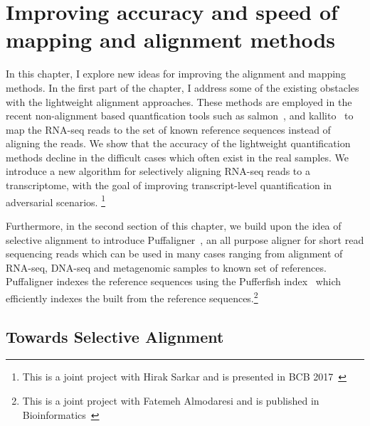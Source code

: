 
\renewcommand{\thechapter}{2}

\chapter[Alignment and mapping metods]
{Improving accuracy and speed of mapping and alignment methods}
\label{chapt2}

In this chapter, I explore new ideas for improving the alignment and mapping methods. 
In the first part of the chapter, I address some of the existing obstacles with the 
lightweight  alignment approaches. These methods are employed in the recent non-alignment 
based quantfication tools such as salmon~\citep{Patro2017Salmon}, and 
kallito~\citep{Bray2016Kallisto} to map the RNA-seq reads to the set of known reference 
sequences instead of aligning the reads. We show that the accuracy of the lightweight 
quantification methods decline in the difficult cases which often exist in the real 
samples. We introduce a new algorithm for selectively aligning RNA-seq reads to a 
transcriptome, with the goal of improving transcript-level quantification in adversarial 
scenarios.
\footnote{This is a joint project with Hirak Sarkar and is presented in BCB 2017~\citep{selaln}}

Furthermore, in the second section of this chapter, we build upon the idea of selective 
alignment to introduce Puffaligner~\citep{almodaresi2021puffaligner}, an all purpose 
aligner for short read sequencing reads which can be used in many cases ranging from 
alignment of RNA-seq, DNA-seq and metagenomic samples to known set of references. 
Puffaligner indexes the reference sequences using the Pufferfish index~\citep{pufferfish} 
which efficiently indexes the \cdbg built from the reference sequences.\footnote{This is 
a joint project with Fatemeh Almodaresi and is published in 
Bioinformatics~\citep{almodaresi2021puffaligner}}


\section{Towards Selective Alignment}

